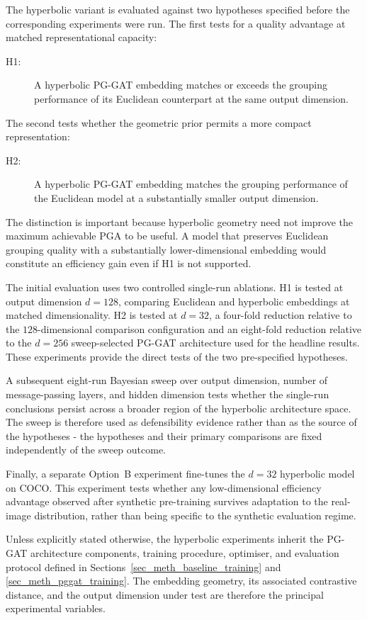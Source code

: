 The hyperbolic variant is evaluated against two hypotheses specified
before the corresponding experiments were run.
The first tests for a quality advantage at matched representational
capacity:

\begin{description}
    \item[H1:] A hyperbolic PG-GAT embedding matches or exceeds the
    grouping performance of its Euclidean counterpart at the same
    output dimension.
\end{description}

The second tests whether the geometric prior permits a more compact
representation:

\begin{description}
    \item[H2:] A hyperbolic PG-GAT embedding matches the grouping
    performance of the Euclidean model at a substantially smaller
    output dimension.
\end{description}

The distinction is important because hyperbolic geometry need not
improve the maximum achievable PGA to be useful.
A model that preserves Euclidean grouping quality
with a substantially lower-dimensional embedding
would constitute an efficiency gain even if H1 is not supported.

The initial evaluation uses two controlled single-run ablations.
H1 is tested at output dimension $d=128$,
comparing Euclidean and hyperbolic embeddings at matched dimensionality.
H2 is tested at $d=32$,
a four-fold reduction relative to the $128$-dimensional comparison
configuration
and an eight-fold reduction relative to the $d=256$ sweep-selected
PG-GAT architecture used for the headline results.
These experiments provide the direct tests of the two pre-specified
hypotheses.

A subsequent eight-run Bayesian sweep over output dimension,
number of message-passing layers,
and hidden dimension
tests whether the single-run conclusions persist across a broader region
of the hyperbolic architecture space.
The sweep is therefore used as defensibility evidence
rather than as the source of the hypotheses -
the hypotheses and their primary comparisons are fixed independently
of the sweep outcome.

Finally, a separate Option~B experiment fine-tunes the
$d=32$ hyperbolic model on COCO.
This experiment tests whether any low-dimensional efficiency advantage
observed after synthetic pre-training survives adaptation
to the real-image distribution,
rather than being specific to the synthetic evaluation regime.

Unless explicitly stated otherwise,
the hyperbolic experiments inherit the PG-GAT architecture components,
training procedure,
optimiser,
and evaluation protocol defined in
Sections~\ref{sec_meth_baseline_training} and
\ref{sec_meth_pggat_training}.
The embedding geometry,
its associated contrastive distance,
and the output dimension under test are therefore the principal
experimental variables.